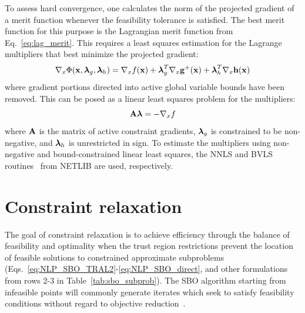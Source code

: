 To assess hard convergence, one calculates the norm of the projected
gradient of a merit function whenever the feasibility tolerance is
satisfied.  The best merit function for this purpose is the Lagrangian
merit function from Eq.~\ref{eq:lag_merit}.  This requires a least
squares estimation for the Lagrange multipliers that best minimize the
projected gradient:
\begin{equation}
\nabla_x \Phi({\bf x}, \mbox{\boldmath $\lambda$}_g, \mbox{\boldmath
$\lambda$}_h) = \nabla_x f({\bf x})
+ \mbox{\boldmath $\lambda$}_g^T \nabla_x {\bf g}^+({\bf x}) +
\mbox{\boldmath $\lambda$}_h^T \nabla_x {\bf h}({\bf x})
\label{eq:lag_merit_grad}
\end{equation}
where gradient portions directed into active global variable bounds
have been removed.  This can be posed as a linear least squares
problem for the multipliers:
\begin{equation}
{\bf A} \mbox{\boldmath $\lambda$} = -\nabla_x f \label{eq:lls_lambda}
\end{equation}
where ${\bf A}$ is the matrix of active constraint gradients,
$\mbox{\boldmath $\lambda$}_g$ is constrained to be non-negative, and
$\mbox{\boldmath $\lambda$}_h$ is unrestricted in sign.  To estimate
the multipliers using non-negative and bound-constrained linear least
squares, the NNLS and BVLS routines~\cite{Law74} from NETLIB are used,
respectively.

\section{Constraint relaxation} \label{sbm:sblm_con_relax}


The goal of constraint relaxation is to achieve efficiency through the
balance of feasibility and optimality when the trust region
restrictions prevent the location of feasible solutions to constrained
approximate subproblems
(Eqs.~\ref{eq:NLP_SBO_TRAL2}-\ref{eq:NLP_SBO_direct}, and other
formulations from rows 2-3 in Table~\ref{tab:sbo_subprob}).  The SBO
algorithm starting from infeasible points will commonly generate
iterates which seek to satisfy feasibility conditions without regard
to objective reduction~\cite{Per04b}.

